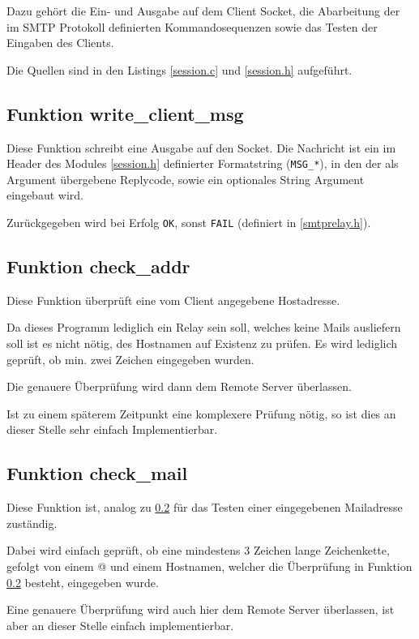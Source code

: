 \documentclass[pdftex,final,a4paper,10pt,notitlepage,halfparskip]{scrreprt}
\begin{document}
Dazu gehört die Ein- und Ausgabe auf dem Client Socket, die Abarbeitung der im SMTP Protokoll definierten Kommandosequenzen sowie das Testen der Eingaben des Clients.

Die Quellen sind in den Listings \ref{session.c} und \ref{session.h} aufgeführt.

\subsection{Funktion write\_client\_msg}\label{fn:write_client_msg}
Diese Funktion schreibt eine Ausgabe auf den Socket. Die Nachricht ist ein im Header des Modules \ref{session.h} definierter Formatstring (\texttt{MSG\_*}), in den der als Argument übergebene Replycode, sowie ein optionales String Argument eingebaut wird.

Zurückgegeben wird bei Erfolg \texttt{OK}, sonst \texttt{FAIL} (definiert in \ref{smtprelay.h}).

\subsection{Funktion check\_addr}\label{fn:check_addr}
Diese Funktion überprüft eine vom Client angegebene Hostadresse. 

Da dieses Programm lediglich ein Relay sein soll, welches keine Mails ausliefern soll ist es nicht nötig, des Hostnamen auf Existenz zu prüfen. Es wird lediglich geprüft, ob min. zwei Zeichen eingegeben wurden. 

Die genauere Überprüfung wird dann dem Remote Server überlassen.

Ist zu einem späterem Zeitpunkt eine komplexere Prüfung nötig, so ist dies an dieser Stelle sehr einfach Implementierbar.

\subsection{Funktion check\_mail}\label{fn:check_mail}
Diese Funktion ist, analog zu \ref{fn:check_addr} für das Testen einer eingegebenen Mailadresse zuständig. 

Dabei wird einfach geprüft, ob eine mindestens 3 Zeichen lange Zeichenkette, gefolgt von einem @ und einem Hostnamen, welcher die Überprüfung in Funktion \ref{fn:check_addr} besteht, eingegeben wurde.

Eine genauere Überprüfung wird auch hier dem Remote Server überlassen, ist aber an dieser Stelle einfach implementierbar.
\end{document}
